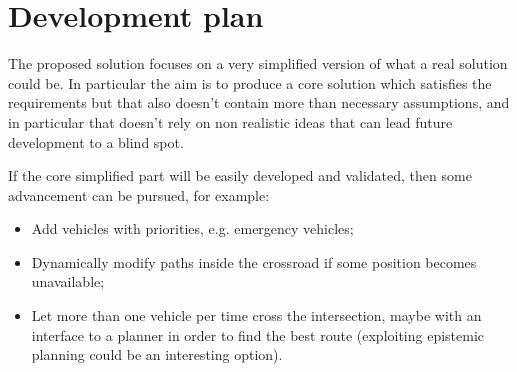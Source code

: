 \documentclass{memoir}
\begin{document}
\section{Development plan}
The proposed solution focuses on a very simplified version of what a real solution could be. In particular the aim is to produce a core solution which satisfies the requirements but that also doesn't contain more than necessary assumptions, and in particular that doesn't rely on non realistic ideas that can lead future development to a blind spot.

If the core simplified part will be easily developed and validated, then some advancement can be pursued, for example:
\begin{itemize}
	\item Add vehicles with priorities, e.g. emergency vehicles;
	\item Dynamically modify paths inside the crossroad if some position becomes unavailable;
	\item Let more than one vehicle per time cross the intersection, maybe with an interface to a planner in order to find the best route (exploiting epistemic planning could be an interesting option).
\end{itemize}









\end{document}
